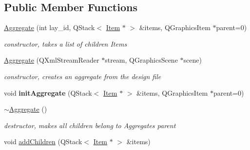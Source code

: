 \subsection*{Public Member Functions}
\begin{DoxyCompactItemize}
\item 
\hyperlink{classprim_1_1Aggregate_ac61218f83cb683de8f3d6c95eed5b510}{Aggregate} (int lay\+\_\+id, Q\+Stack$<$ \hyperlink{classprim_1_1Item}{Item} $\ast$ $>$ \&items, Q\+Graphics\+Item $\ast$parent=0)\hypertarget{classprim_1_1Aggregate_ac61218f83cb683de8f3d6c95eed5b510}{}\label{classprim_1_1Aggregate_ac61218f83cb683de8f3d6c95eed5b510}

\begin{DoxyCompactList}\small\item\em constructor, takes a list of children Items \end{DoxyCompactList}\item 
\hyperlink{classprim_1_1Aggregate_af13ccee1d00b7f611d5e46969934e461}{Aggregate} (Q\+Xml\+Stream\+Reader $\ast$stream, Q\+Graphics\+Scene $\ast$scene)\hypertarget{classprim_1_1Aggregate_af13ccee1d00b7f611d5e46969934e461}{}\label{classprim_1_1Aggregate_af13ccee1d00b7f611d5e46969934e461}

\begin{DoxyCompactList}\small\item\em constructor, creates an aggregate from the design file \end{DoxyCompactList}\item 
void {\bfseries init\+Aggregate} (Q\+Stack$<$ \hyperlink{classprim_1_1Item}{Item} $\ast$ $>$ \&items, Q\+Graphics\+Item $\ast$parent=0)\hypertarget{classprim_1_1Aggregate_ae60f489ad9a4381167c669f40779369c}{}\label{classprim_1_1Aggregate_ae60f489ad9a4381167c669f40779369c}

\item 
\hyperlink{classprim_1_1Aggregate_a8b775ab9dfdf4f8edc691ca522db45de}{$\sim$\+Aggregate} ()\hypertarget{classprim_1_1Aggregate_a8b775ab9dfdf4f8edc691ca522db45de}{}\label{classprim_1_1Aggregate_a8b775ab9dfdf4f8edc691ca522db45de}

\begin{DoxyCompactList}\small\item\em destructor, makes all children belong to Aggregates parent \end{DoxyCompactList}\item 
void \hyperlink{classprim_1_1Aggregate_a107195b0a0742ae570474c0591ef3c22}{add\+Children} (Q\+Stack$<$ \hyperlink{classprim_1_1Item}{Item} $\ast$ $>$ \&items)\hypertarget{classprim_1_1Aggregate_a107195b0a0742ae570474c0591ef3c22}{}\label{classprim_1_1Aggregate_a107195b0a0742ae570474c0591ef3c22}


\end{DoxyCompactItemize}
